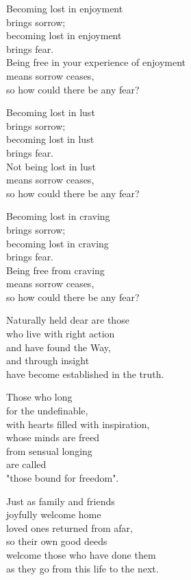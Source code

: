 Becoming lost in enjoyment\\
brings sorrow;\\
becoming lost in enjoyment\\
brings fear.\\
Being free in your experience of enjoyment\\
means sorrow ceases,\\
so how could there be any fear?


Becoming lost in lust\\
brings sorrow;\\
becoming lost in lust\\
brings fear.\\
Not being lost in lust\\
means sorrow ceases,\\
so how could there be any fear?



Becoming lost in craving\\
brings sorrow;\\
becoming lost in craving\\
brings fear.\\
Being free from craving\\
means sorrow ceases,\\
so how could there be any fear?


Naturally held dear are those\\
who live with right action\\
and have found the Way,\\
and through insight\\
have become established in the truth.


Those who long\\
for the undefinable,\\
with hearts filled with inspiration,\\
whose minds are freed\\
from sensual longing\\
are called\\
"those bound for freedom".


Just as family and friends\\
joyfully welcome home\\
loved ones returned from afar,\\
so their own good deeds\\
welcome those who have done them\\
as they go from this life to the next.


